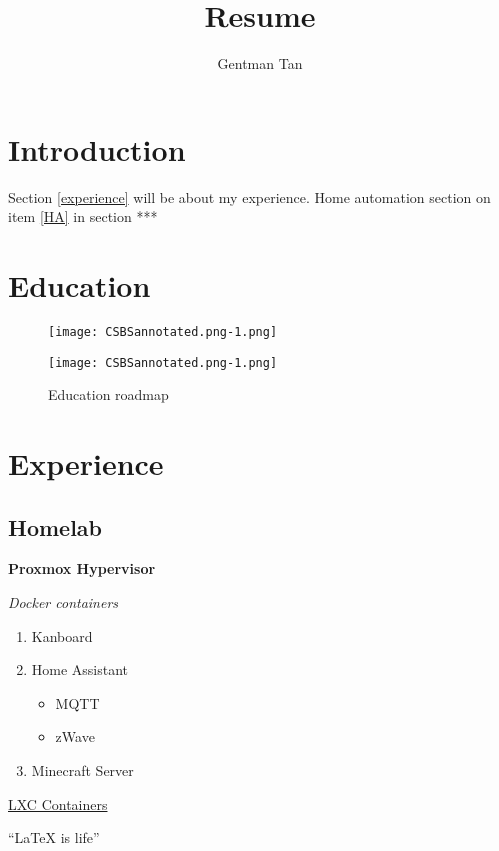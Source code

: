 \documentclass{article}
\author{Gentman Tan}
\title{Resume}
\begin{document}
\maketitle

\section{Introduction}
Section \ref{experience} will be about my experience. Home automation section on item \ref{HA} in section ***

\section{Education}
\begin{wrapfigure}{c}{3in}
\texttt{[image: CSBSannotated.png-1.png]}
\caption{Education roadmap}
\texttt{[image: CSBSannotated.png-1.png]}
\end{wrapfigure}

\section{Experience\label{experience}}

\subsection{Homelab}
\textbf{Proxmox Hypervisor}

\emph{Docker containers}
\begin{enumerate}
\item Kanboard

\item Home Assistant\label{HA}
\begin{itemize}
\item MQTT
\item zWave
\end{itemize}

\item Minecraft Server
\end{enumerate}

\underline{LXC Containers}

``\LaTeX{} is life''
\end{document}
